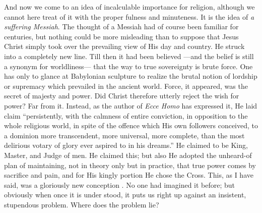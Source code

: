 \documentclass[12pt,a5paper,oneside]{book}
\begin{document}
And now we come to an idea of incalculable
importance for religion, although we cannot here
treat of it with the proper fulness and minuteness. 
It is the idea of \textit{a suffering Messiah}.
The thought of a Messiah had of course been
familiar for centuries, but nothing could be
more misleading than to suppose that Jesus
Christ simply took over the prevailing view of
His day and country. He struck into a completely 
new line. Till then it had been believed
---and the belief is still a synonym for worldliness---
that the way to true sovereignty is brute
force. One has only to glance at Babylonian
sculpture to realize the brutal notion of lordship
or supremacy which prevailed in the ancient
world. Force, it appeared, was the secret
of majesty and power. Did Christ therefore
utterly reject the wish for power? Far from
it. Instead, as the author of \textit{Ecce Homo} has
expressed it, He laid claim ``persistently, with
the calmness of entire conviction, in opposition
to the whole religious world, in spite of the
offence which His own followers conceived, to
a dominion more transcendent, more universal,
more complete, than the most delirious votary
of glory ever aspired to in his dreams.'' He
claimed to be King, Master, and Judge of men.
He claimed this; but also He adopted the
unheard-of plan of maintaining, not in theory
only but in practice, that true power comes by
sacrifice and pain, and for His kingly portion He
chose the Cross. This, as I have said, was a
gloriously new conception . No one had imagined
it before; but obviously when once it is under
stood, it puts us right up against an insistent, 
stupendous problem. Where does the
problem lie?
\end{document}

